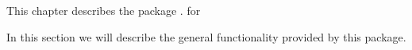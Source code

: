 

This  chapter  describes  the  package  {\ActionTestOldDocPackage}.
for {} \cite{GAP4}



In this section we  will  describe the  general functionality provided by
this package.
